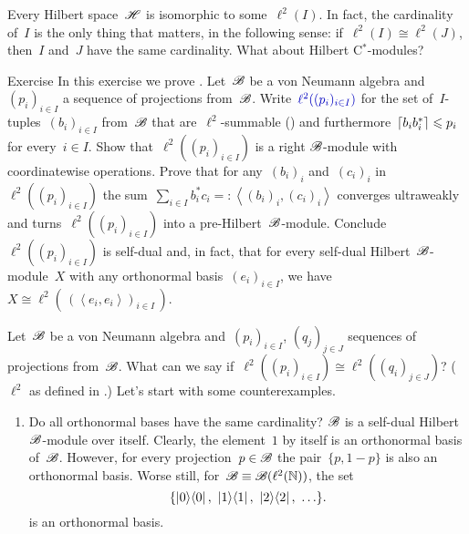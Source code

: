\documentclass[b]{subfiles}
\begin{document}
\begin{parsec}%
\begin{point}%
Every Hilbert space~$\mathscr{H}$ is isomorphic to some~$\ell^2(I)$.
In fact, the cardinality of~$I$ is the only thing that matters,
    in the following sense:
    if~$\ell^2(I) \cong \ell^2(J)$, then~$I$ and~$J$
    have the same cardinality.
What about Hilbert C$^*$-modules?
\end{point}
\begin{point}[hilbmod-el2]{Exercise}%
In this exercise we prove \cite[Thm.~3.12]{paschke}.
Let~$\mathscr{B}$ be a von Neumann algebra
    and~$(p_i)_{i \in I}$
    a sequence of projections from~$\mathscr{B}$.
    Write~$\Define{\ell^2((p_i)_{i \in I})}$
    for the set of~$I$-tuples~$(b_i)_{i \in I}$
    from~$\mathscr{B}$ that are~$\ell^2$-summable ()
    and furthermore~$\left\lceil b_ib_i^*\right\rceil \leqslant p_i$ for every~$i \in I$.
Show that~$\ell^2((p_i)_{i \in I})$
    is a right $\mathscr{B}$-module
    with coordinatewise operations.
Prove that for any~$(b_i)_i$ and~$(c_i)_i$
    in~$\ell^2((p_i)_{i \in I})$
    the sum~$\sum_{i \in I} b_i^* c_i =: \left<(b_i)_i, (c_i)_i\right>$
    converges ultraweakly
    and turns~$\ell^2((p_i)_{i\in I})$ into a pre-Hilbert~$\mathscr{B}$-module.
    Conclude~$\ell^2((p_i)_{i \in I})$ is self-dual
and, in fact, that for every self-dual Hilbert~$\mathscr{B}$-module~$X$
    with any orthonormal basis~$(e_i)_{i \in I}$,
    we have~$X \cong \ell^2(\,(\left<e_i,e_i\right>)_{i \in I}\,)$.
\end{point}

\begin{point}%
    Let~$\mathscr{B}$ be a von Neumann algebra
        and~$(p_i)_{i \in I}$, $(q_j)_{j \in J}$
        sequences of projections from~$\mathscr{B}$.
    What can we say if~$\ell^2((p_i)_{i \in I}) 
    \cong \ell^2((q_i)_{j \in J})$?
    ($\ell^2$ as defined in .)
    Let's start with some counterexamples.
\begin{enumerate}
\item
Do all orthonormal bases have the same cardinality?
$\mathscr{B}$ is a self-dual Hilbert~$\mathscr{B}$-module over itself.
Clearly, the element~$1$ by itself is an orthonormal basis of~$\mathscr{B}$.
However, for every projection~$p \in \mathscr{B}$
        the pair~$\{ p,1-p \}$ is also an orthonormal basis.
    Worse still, for~$\mathscr{B} \equiv \mathscr{B}(\ell^2(\mathbb{N}))$,
        the set
\begin{equation*}
    \{\ketbra{0}{0}, \ \ketbra{1}{1},\  \ketbra{2}{2},\  \ldots \}.
\end{equation*}
is an orthonormal basis.


\end{enumerate}
\end{point}
\end{parsec}
\end{document}
